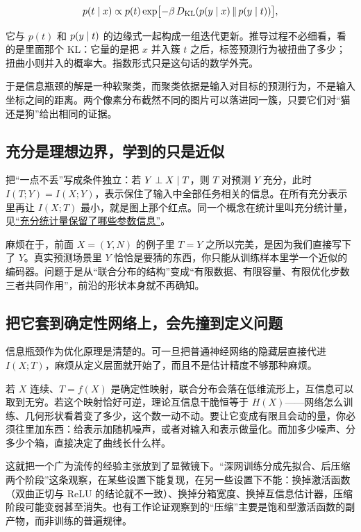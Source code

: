 \[
p(t\mid x)\propto p(t)\exp\bigl[-\beta\,D_{\mathrm{KL}}(p(y\mid x)\,\|\,p(y\mid t))\bigr],
\]

它与 \(p(t)\) 和 \(p(y\mid t)\) 的边缘式一起构成一组迭代更新。推导过程不必细看，看的是里面那个 KL：它量的是把 \(x\) 并入簇 \(t\) 之后，标签预测行为被扭曲了多少；扭曲小则并入的概率大。指数形式只是这句话的数学外壳。

于是信息瓶颈的解是一种软聚类，而聚类依据是输入对目标的预测行为，不是输入坐标之间的距离。两个像素分布截然不同的图片可以落进同一簇，只要它们对``猫还是狗''给出相同的证据。

\subsection{充分是理想边界，学到的只是近似}

把``一点不丢''写成条件独立：若 \(Y\perp X\mid T\)，则 \(T\) 对预测 \(Y\) 充分，此时 \(I(T;Y)=I(X;Y)\)，表示保住了输入中全部任务相关的信息。在所有充分表示里再让 \(I(X;T)\) 最小，就是图上那个红点。同一个概念在统计里叫充分统计量，见\hyperref[sec:11-Mathematical-Statistics/03-Sufficient-Statistics-and-Information/01]{``充分统计量保留了哪些参数信息''}。

麻烦在于，前面 \(X=(Y,N)\) 的例子里 \(T=Y\) 之所以完美，是因为我们直接写下了 \(Y\)。真实预测场景里 \(Y\) 恰恰是要猜的东西，你只能从训练样本里学一个近似的编码器。问题于是从``联合分布的结构''变成``有限数据、有限容量、有限优化步数三者共同作用''，前沿的形状本身就不再确知。

\subsection{把它套到确定性网络上，会先撞到定义问题}

信息瓶颈作为优化原理是清楚的。可一旦把普通神经网络的隐藏层直接代进 \(I(X;T)\)，麻烦从定义层面就开始了，而且不是估计精度不够那种麻烦。

若 \(X\) 连续、\(T=f(X)\) 是确定性映射，联合分布会落在低维流形上，互信息可以取到无穷。若这个映射恰好可逆，理论互信息干脆恒等于 \(H(X)\)——网络怎么训练、几何形状看着变了多少，这个数一动不动。要让它变成有限且会动的量，你必须往里加东西：给表示加随机噪声，或者对输入和表示做量化。而加多少噪声、分多少个箱，直接决定了曲线长什么样。

这就把一个广为流传的经验主张放到了显微镜下。``深网训练分成先拟合、后压缩两个阶段''这条观察，在某些设置下能复现，在另一些设置下不能：换掉激活函数（双曲正切与 ReLU 的结论就不一致）、换掉分箱宽度、换掉互信息估计器，压缩阶段可能变弱甚至消失。也有工作论证观察到的``压缩''主要是饱和型激活函数的副产物，而非训练的普遍规律。


